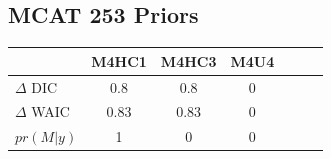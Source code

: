\documentclass[12pt]{article}
\begin{document}
%
%
%
%	
%
%
\clearpage
\subsection{MCAT 253 Priors}
	\begin{table}[ht!]
        \centering
        \begin{tabular}[c]{@{}lcccccc@{}}
        \hline
        & M4HC1 & M4HC3 & M4U4 \\ \hline
	\(\Delta\) DIC & 0.8 & 0.8 & 0 \\                                                 
	\(\Delta\) WAIC & 0.83 & 0.83 & 0 \\                                              
	\(pr(M|y)\) & 1 & 0 & 0
        \end{tabular}
        \end{table}
\end{document}
